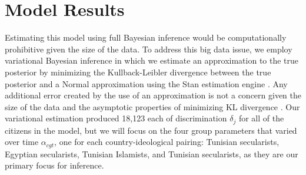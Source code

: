 \documentclass[12pt]{article}
\begin{document}
\section*{Model Results}

Estimating this model using full Bayesian inference would be computationally prohibitive given the size of the data. To address this big data issue, we employ variational Bayesian inference in which we estimate an approximation to the true posterior by minimizing the Kullback-Leibler divergence between the true posterior and a Normal approximation using the Stan estimation engine \parencite{NIPS2015_5758}. Any additional error created by the use of an approximation is not a concern given the size of the data and the asymptotic properties of minimizing KL divergence \parencite{NIPS2015_5758}. Our variational estimation produced 18,123 each of discrimination $\delta_j$ for all of the citizens in the model, but we will focus on the four group parameters that varied over time $\alpha_{cgt}$, one for each country-ideological pairing: Tunisian secularists, Egyptian secularists, Tunisian Islamists, and Tunisian secularists, as they are our primary focus for inference.
\end{document}
